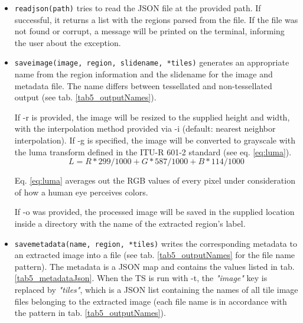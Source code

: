 \begin{itemize}
	\item \texttt{read{\textunderscore}json(path)} tries to read the JSON file at the provided path. If successful, it returns a list with the regions parsed from the file. If the file was not found or corrupt, a message will be printed on the terminal, informing the user about the exception.
	
	\item \texttt{save{\textunderscore}image(image, region, slide{\textunderscore}name, *tiles)} generates an appropriate name from the region information and the slide{\textunderscore}name for the image and metadata file. The name differs between tessellated and non-tessellated output (see tab. \ref{tab5_outputNames}).
	
	If -r is provided, the image will be resized to the supplied height and width, with the interpolation method provided via -i (default: nearest neighbor interpolation). If -g is specified, the image will be converted to grayscale with the luma transform defined in the ITU-R 601-2 standard\cite{ITUR94} (see eq. \ref{eq:luma}).
	\begin{equation}\label{eq:luma}
		L = R * 299/1000 + G * 587/1000 + B * 114/1000
	\end{equation}
	
	Eq. \ref{eq:luma} averages out the RGB values of every pixel under consideration of how a human eye perceives colors.
	
	If -o was provided, the processed image will be saved in the supplied location inside a directory with the name of the extracted region's label.
	
	\item \texttt{save{\textunderscore}metadata(name, region, *tiles)} writes the corresponding metadata to an extracted image into a file (see tab. \ref{tab5_outputNames} for the file name pattern). The metadata is a JSON map and contains the values listed in tab. \ref{tab5_metadataJson}. When the TS is run with -t, the \emph{"image"} key is replaced by \emph{"tiles"}, which is a JSON list containing the names of all tile image files belonging to the extracted image (each file name is in accordance with the pattern in tab. \ref{tab5_outputNames}).
	

\end{itemize}
